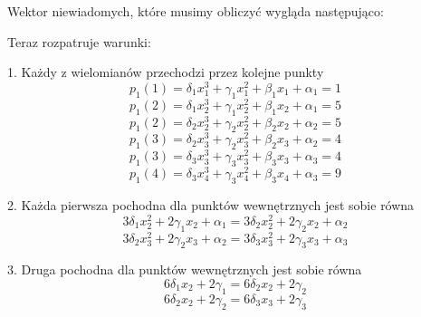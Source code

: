 \documentclass[varwidth,12pt,a4paper]{article}
\begin{document}
Wektor niewiadomych, które musimy obliczyć wygląda następująco:
\begin{equation}
    [\delta _1, \delta_2, \delta_3, \gamma _1, \gamma _2, \gamma_3, \beta _1, \beta _2, \beta _3, \alpha _1, \alpha _2, \alpha _3 ]
\end{equation}


Teraz rozpatruje warunki:

1. Każdy z wielomianów przechodzi przez kolejne punkty
\begin{equation}
    p_1(1) = \delta _1 x_1^3 + \gamma _1 x_1^2 + \beta _1 x_1 + \alpha _1 = 1
\end{equation}
\begin{equation}
    p_1(2) = \delta _1 x_2^3 + \gamma _1 x_2^2 + \beta _1 x_2 + \alpha _1 = 5
\end{equation}
\begin{equation}
    p_1(2) = \delta _2 x_2^3 + \gamma _2 x_2^2 + \beta _2 x_2 + \alpha _2 = 5
\end{equation}
\begin{equation}
    p_1(3) = \delta _2 x_3^3 + \gamma _2 x_3^2 + \beta _2 x_3 + \alpha _2 = 4
\end{equation}
\begin{equation}
    p_1(3) = \delta _3 x_3^3 + \gamma _3 x_3^2 + \beta _3 x_3 + \alpha _3 = 4
\end{equation}
\begin{equation}
    p_1(4) = \delta _3 x_4^3 + \gamma _3 x_4^2 + \beta _3 x_4 + \alpha _3 = 9
\end{equation}

2. Każda pierwsza pochodna dla punktów wewnętrznych jest sobie równa
\begin{equation}
    3 \delta _1 x_2 ^2 + 2 \gamma _1 x_2 + \alpha _1 = 3 \delta _2 x_2 ^2 + 2 \gamma _2 x_2 + \alpha _2
\end{equation}
\begin{equation}
    3 \delta _2 x_3 ^2 + 2 \gamma _2 x_3 + \alpha _2 = 3 \delta _3 x_3 ^2 + 2 \gamma _3 x_3 + \alpha _3
\end{equation}

3. Druga pochodna dla punktów wewnętrznych jest sobie równa
\begin{equation}
    6\delta _1 x_2 + 2 \gamma _1 = 6 \delta _2 x_2 + 2 \gamma _2
\end{equation}
\begin{equation}
    6\delta _2 x_2 + 2 \gamma _2 = 6 \delta _3 x_3 + 2 \gamma _3
\end{equation}
\end{document}
